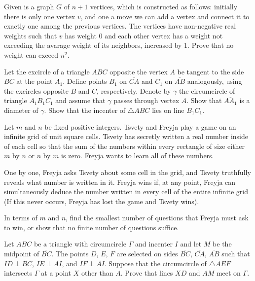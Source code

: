 \documentclass[11pt]{scrartcl}
\begin{document}
\begin{problem}[493735785757154]
	Given is a graph $G$ of $n+1$ vertices, which is constructed as follows: initially there is only one vertex $v$, and one a move we can add a vertex and connect it to exactly one among the previous vertices. The vertices have non-negative real weights such that $v$ has weight $0$ and each other vertex has a weight not exceeding the avarage weight of its neighbors, increased by $1$. Prove that no weight can exceed $n^2$.
\end{problem}
\begin{problem}[495587557940069]
Let the excircle of a triangle $ABC$ opposite the vertex $A$ be tangent to the side $BC$ at the point $A_1$. Define points $B_1$ on $\overline{CA}$ and $C_1$ on $\overline{AB}$ analogously, using the excircles opposite $B$ and $C$, respectively. Denote by $\gamma$ the circumcircle of triangle $A_1B_1C_1$ and assume that $\gamma$ passes through vertex $A$.
Show that $\overline{AA_1}$ is a diameter of $\gamma$.
Show that the incenter of $\triangle ABC$ lies on line $B_1C_1$.
\end{problem}
\begin{problem}[496656338551810]
Let $m$ and $n$ be fixed positive integers. Tsvety and Freyja play a game on an infinite grid of unit square cells. Tsvety has secretly written a real number inside of each cell so that the sum of the numbers within every rectangle of size either $m$ by $n$ or $n$ by $m$ is zero. Freyja wants to learn all of these numbers.

One by one, Freyja asks Tsvety about some cell in the grid, and Tsvety truthfully reveals what number is written in it. Freyja wins if, at any point, Freyja can simultaneously deduce the number written in every cell of the entire infinite grid (If this never occurs, Freyja has lost the game and Tsvety wins).

In terms of $m$ and $n$, find the smallest number of questions that Freyja must ask to win, or show that no finite number of questions suffice.

\end{problem}
\begin{problem}[497699112554737]
Let $ABC$ be a triangle with circumcircle $\Gamma$ and incenter $I$ and let $M$ be the midpoint of $\overline{BC}$. The points $D$, $E$, $F$ are selected on sides $\overline{BC}$, $\overline{CA}$, $\overline{AB}$ such that $\overline{ID} \perp \overline{BC}$, $\overline{IE}\perp \overline{AI}$, and $\overline{IF}\perp \overline{AI}$. Suppose that the circumcircle of $\triangle AEF$ intersects $\Gamma$ at a point $X$ other than $A$. Prove that lines $XD$ and $AM$ meet on $\Gamma$.
\end{problem}
\end{document}
